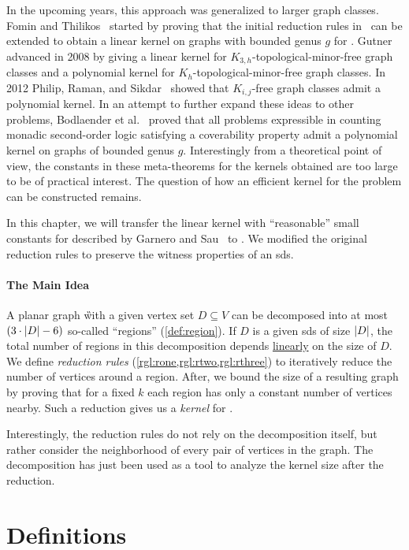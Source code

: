 In the upcoming years, this approach was generalized to larger graph classes. 
Fomin and Thilikos~\cite{Fomin2004} started by proving that the initial reduction rules in~\cite{Alber2004} can be extended to obtain a linear kernel on graphs with bounded genus $g$ for \dom.
Gutner~\cite{Gutner2009} advanced in 2008 by giving a linear kernel for $K_{3,h}$-topological-minor-free graph classes and a polynomial kernel for $K_h$-topological-minor-free graph classes. 
In 2012 Philip, Raman, and Sikdar~\cite{Philip2012} showed that $K_{i,j}$-free graph classes admit a polynomial kernel. 
In an attempt to further expand these ideas to other problems, Bodlaender et al.~\cite{Bodlaender2016} proved that all problems expressible in counting monadic second-order logic satisfying a coverability property admit a polynomial kernel on graphs of bounded genus $g$. 
Interestingly from a theoretical point of view, the constants in these meta-theorems for the kernels obtained are too large to be of practical interest. 
The question of how an efficient kernel for the \psdom problem can be constructed remains. 

In this chapter, we will transfer the linear kernel with ``reasonable'' small constants for \ptdom described by Garnero and Sau~\cite[arXiv v2]{Garnero2018} to \psdom. 
We modified the original reduction rules to preserve the witness properties of an sds. 

 \paragraph{The Main Idea} A planar graph \G with a given vertex set $D \subseteq V$ can be decomposed into at most $(3 \cdot \abs{D}-6)$ so-called ``regions'' (\cref{def:region}). 
 If $D$ is a given sds of size $\abs{D}$, the total number of regions in this decomposition depends \underline{linearly} on the size of $D$. 
 We define \textit{reduction rules} (\cref{rgl:rone,rgl:rtwo,rgl:rthree}) to iteratively reduce the number of vertices around a region.
 After, we bound the size of a resulting graph by proving that for a fixed $k$ each region has only a constant number of vertices nearby. 
Such a reduction gives us a \textit{kernel} for \psdom.

Interestingly, the reduction rules do not rely on the decomposition itself, but rather consider the neighborhood of every pair of vertices in the graph. 
The decomposition has just been used as a tool to analyze the kernel size after the reduction.


\section{Definitions}

